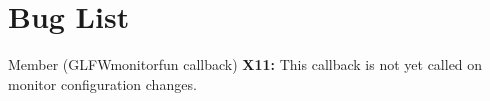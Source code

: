 \chapter{Bug List}
\hypertarget{bug}{}\label{bug}

\begin{DoxyRefList}
\item[Member \doxylink{group__monitor_ga9fa7cc37cd79216a7fc0b77af54109a1}{glfw\+Set\+Monitor\+Callback} (GLFWmonitorfun callback)]\label{bug__bug000001}%
%
{\bfseries{X11\+:}} This callback is not yet called on monitor configuration changes.
\end{DoxyRefList}